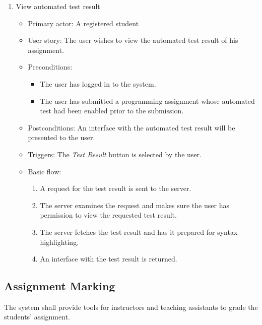 \begin{enumerate}
\item View automated test result
\begin{itemize}
    \item Primary actor: A registered student
    \item User story: The user wishes to view the automated test result of his
        assignment.
    \item Preconditions:
        \begin{itemize}
            \item The user has logged in to the system.
            \item The user has submitted a programming assignment whose
                automated test had been enabled prior to the submission.
        \end{itemize}
    \item Postconditions:
        An interface with the automated test result will be presented to the
        user.
    \item Triggers: 
        The \emph{Test Result} button is selected by the user.
    \item Basic flow:
        \begin{enumerate}
            \item A request for the test result is sent to the server.
            \item The server examines the request and makes sure the user has
                permission to view the requested test result.
            \item The server fetches the test result and has it prepared for
                syntax highlighting.
            \item An interface with the test result is returned.
        \end{enumerate}
\end{itemize}
\end{enumerate}

\subsection{Assignment Marking}
The system shall provide tools for instructors and teaching assistants to grade
the students' assignment.

